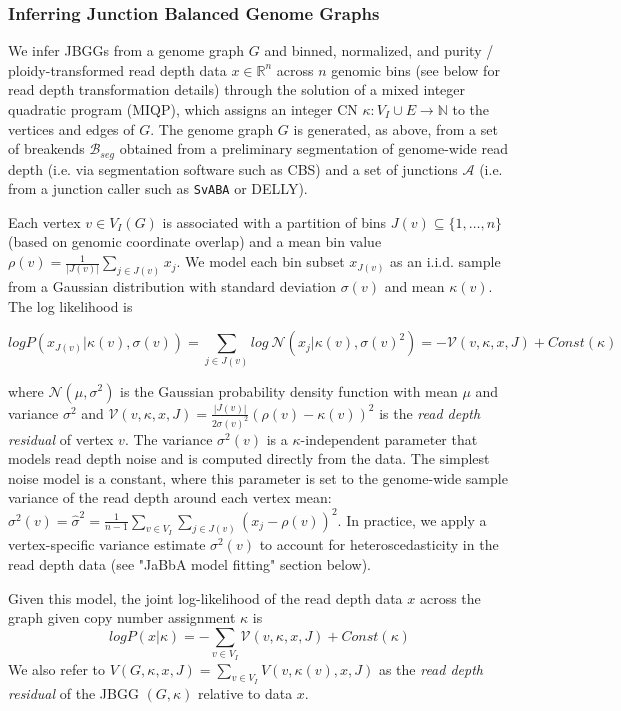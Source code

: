 \documentclass[phd,tocprelim]{cornell}
\begin{document}
\subsubsection*{Inferring Junction Balanced Genome Graphs}
We infer JBGGs from a genome graph $G$ and binned, normalized, and purity / ploidy-transformed read depth data $x \in \mathbb{R}^n$ across $n$ genomic bins (see below for read depth transformation details)  through the solution of a mixed integer quadratic program (MIQP), which assigns an integer CN $\kappa:V_I \cup E \rightarrow \mathbb{N}$ to the vertices and edges of $G$.  The genome graph $G$ is generated, as above, from a set of breakends $\mathcal{B}_{seg}$ obtained from a preliminary segmentation of genome-wide read depth (i.e. via segmentation software such as CBS) and a set of junctions $\mathcal{A}$ (i.e. from a junction caller such as \texttt{SvABA} or DELLY).  

Each vertex $v \in V_I(G)$ is associated with a partition of bins $J(v) \subseteq \{1, \ldots, n\}$ (based on genomic coordinate overlap) and a mean bin value $\rho(v) = \frac{1}{|J(v)|}\sum_{j \in J(v)} x_j$.  We model each bin subset $x_{J(v)}$ as an i.i.d. sample from a Gaussian distribution with standard deviation $\sigma(v)$ and mean $\kappa(v)$.  The log likelihood is

\begin{equation} \label{eq:nodeloglikelihood}
log P(x_{J(v)} | \kappa(v), \sigma(v)) =  \sum_{j \in J(v)} log \ \mathcal{N}(x_j | \kappa(v), \sigma(v)^2) = - \mathcal{V}(v, \kappa, x, J) + Const(\kappa)
\end{equation} 

where $\mathcal{N}(\mu, \sigma^2)$ is the Gaussian probability density function with mean $\mu$ and variance $\sigma^2$ and $\mathcal{V}(v, \kappa, x, J) =  \frac{|J(v)|}{2\sigma(v)^2}(\rho(v)- \kappa(v))^2$ is the \textit{read depth residual} of vertex $v$. The variance $\sigma^2(v)$ is a $\kappa$-independent parameter that models read depth noise and is computed directly from the data.  The simplest noise model is a constant, where this parameter is set to the genome-wide sample variance of the read depth around each vertex mean: $\sigma^2(v) = \hat{\sigma}^2 = \frac{1}{n-1} \sum_{v \in V_I} \sum_{j \in J(v)} (x_j - \rho(v))^2$.  In practice, we apply a vertex-specific variance estimate $\sigma^2(v)$ to account for heteroscedasticity in the read depth data (see "JaBbA model fitting" section below).  

Given this model, the joint log-likelihood of the read depth data $x$ across the graph given copy number assignment $\kappa$ is
\begin{equation} \label{eq:jointloglikelihood}
log P(x | \kappa) = - \sum_{v \in V_I} \mathcal{V}(v, \kappa, x, J) + Const(\kappa) 
\end{equation} 
We also refer to $V(G, \kappa, x, J) = \sum_{v\in V_I} V(v, \kappa(v), x, J)$ as the \textit{read depth residual} of the JBGG $(G, \kappa)$ relative to data $x$.
\end{document}
